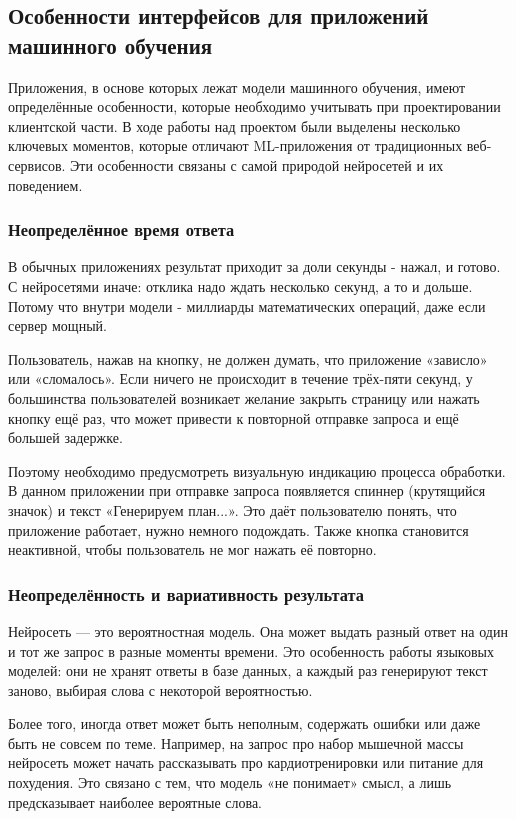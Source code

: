 \documentclass[14pt, a4paper]{extarticle}
\begin{document}
\begin{enumerate}
\subsection{Особенности интерфейсов для приложений машинного обучения}

\noindent Приложения, в основе которых лежат модели машинного обучения, имеют определённые особенности, которые необходимо учитывать при проектировании клиентской части. В ходе работы над проектом были выделены несколько ключевых моментов, которые отличают ML-приложения от традиционных веб-сервисов. Эти особенности связаны с самой природой нейросетей и их поведением.

\subsubsection{Неопределённое время ответа}

\noindent В обычных приложениях результат приходит за доли секунды - нажал, и готово. С нейросетями иначе: отклика надо ждать несколько секунд, а то и дольше. Потому что внутри модели - миллиарды математических операций, даже если сервер мощный.

\medskip
\noindent Пользователь, нажав на кнопку, не должен думать, что приложение «зависло» или «сломалось». Если ничего не происходит в течение трёх-пяти секунд, у большинства пользователей возникает желание закрыть страницу или нажать кнопку ещё раз, что может привести к повторной отправке запроса и ещё большей задержке.

\medskip
\noindent Поэтому необходимо предусмотреть визуальную индикацию процесса обработки. В данном приложении при отправке запроса появляется спиннер (крутящийся значок) и текст «Генерируем план...». Это даёт пользователю понять, что приложение работает, нужно немного подождать. Также кнопка становится неактивной, чтобы пользователь не мог нажать её повторно.

\subsubsection{Неопределённость и вариативность результата}

\noindent Нейросеть — это вероятностная модель. Она может выдать разный ответ на один и тот же запрос в разные моменты времени. Это особенность работы языковых моделей: они не хранят ответы в базе данных, а каждый раз генерируют текст заново, выбирая слова с некоторой вероятностью.

\medskip
\noindent Более того, иногда ответ может быть неполным, содержать ошибки или даже быть не совсем по теме. Например, на запрос про набор мышечной массы нейросеть может начать рассказывать про кардиотренировки или питание для похудения. Это связано с тем, что модель «не понимает» смысл, а лишь предсказывает наиболее вероятные слова.


\end{enumerate}
\end{document}
